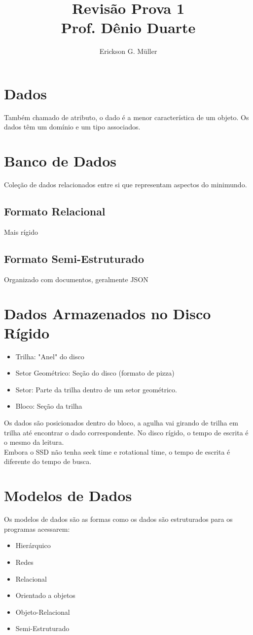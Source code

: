 \documentclass[ ]{article}
\title{Revisão Prova 1\\ Prof. Dênio Duarte}
\author{Erickson G. Müller}
\begin{document}
	\maketitle
	\newpage
	\section{Dados}
		Também chamado de atributo, o dado é a menor característica de um objeto. Os dados têm um domínio e um tipo associados.
	\section{Banco de Dados}
		Coleção de dados relacionados entre si que representam aspectos do minimundo.
		\subsection{Formato Relacional}
			Mais rígido
		\subsection{Formato Semi-Estruturado}
			Organizado com documentos, geralmente JSON
	\section{Dados Armazenados no Disco Rígido}
		\begin{itemize}
			\item Trilha: "Anel" do disco
			\item Setor Geométrico: Seção do disco (formato de pizza)
			\item Setor: Parte da trilha dentro de um setor geométrico.
			\item Bloco: Seção da trilha
		\end{itemize}
		Os dados são posicionados dentro do bloco, a agulha vai girando de trilha em trilha até encontrar o dado correspondente. No disco rígido, o tempo de escrita é o mesmo da leitura.\\
		Embora o SSD  não tenha seek time e rotational time, o tempo de escrita é diferente do tempo de busca.
	\section{Modelos de Dados}
		Os modelos de dados são as formas como os dados são estruturados para os programas acessarem:
		\begin{itemize}
			\item Hierárquico
			\item Redes
			\item Relacional
			\item Orientado a objetos
			\item Objeto-Relacional
			\item Semi-Estruturado
		\end{itemize}
\end{document}
